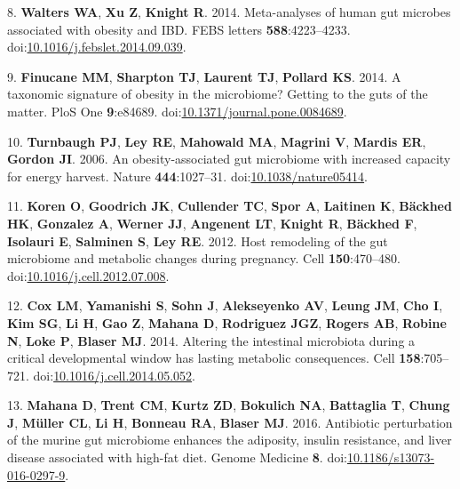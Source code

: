 \documentclass[12pt,]{article}
\begin{document}
\hypertarget{ref-waltersux5fmeta-analysesux5f2014}{}
8. \textbf{Walters WA}, \textbf{Xu Z}, \textbf{Knight R}. 2014.
Meta-analyses of human gut microbes associated with obesity and IBD.
FEBS letters \textbf{588}:4223--4233.
doi:\href{https://doi.org/10.1016/j.febslet.2014.09.039}{10.1016/j.febslet.2014.09.039}.

\hypertarget{ref-finucaneux5ftaxonomicux5f2014}{}
9. \textbf{Finucane MM}, \textbf{Sharpton TJ}, \textbf{Laurent TJ},
\textbf{Pollard KS}. 2014. A taxonomic signature of obesity in the
microbiome? Getting to the guts of the matter. PloS One
\textbf{9}:e84689.
doi:\href{https://doi.org/10.1371/journal.pone.0084689}{10.1371/journal.pone.0084689}.

\hypertarget{ref-turnbaughux5fobesity-associatedux5f2006}{}
10. \textbf{Turnbaugh PJ}, \textbf{Ley RE}, \textbf{Mahowald MA},
\textbf{Magrini V}, \textbf{Mardis ER}, \textbf{Gordon JI}. 2006. An
obesity-associated gut microbiome with increased capacity for energy
harvest. Nature \textbf{444}:1027--31.
doi:\href{https://doi.org/10.1038/nature05414}{10.1038/nature05414}.

\hypertarget{ref-Koren2012}{}
11. \textbf{Koren O}, \textbf{Goodrich JK}, \textbf{Cullender TC},
\textbf{Spor A}, \textbf{Laitinen K}, \textbf{Bäckhed HK},
\textbf{Gonzalez A}, \textbf{Werner JJ}, \textbf{Angenent LT},
\textbf{Knight R}, \textbf{Bäckhed F}, \textbf{Isolauri E},
\textbf{Salminen S}, \textbf{Ley RE}. 2012. Host remodeling of the gut
microbiome and metabolic changes during pregnancy. Cell
\textbf{150}:470--480.
doi:\href{https://doi.org/10.1016/j.cell.2012.07.008}{10.1016/j.cell.2012.07.008}.

\hypertarget{ref-Cox2014}{}
12. \textbf{Cox LM}, \textbf{Yamanishi S}, \textbf{Sohn J},
\textbf{Alekseyenko AV}, \textbf{Leung JM}, \textbf{Cho I}, \textbf{Kim
SG}, \textbf{Li H}, \textbf{Gao Z}, \textbf{Mahana D}, \textbf{Rodriguez
JGZ}, \textbf{Rogers AB}, \textbf{Robine N}, \textbf{Loke P},
\textbf{Blaser MJ}. 2014. Altering the intestinal microbiota during a
critical developmental window has lasting metabolic consequences. Cell
\textbf{158}:705--721.
doi:\href{https://doi.org/10.1016/j.cell.2014.05.052}{10.1016/j.cell.2014.05.052}.

\hypertarget{ref-Mahana2016}{}
13. \textbf{Mahana D}, \textbf{Trent CM}, \textbf{Kurtz ZD},
\textbf{Bokulich NA}, \textbf{Battaglia T}, \textbf{Chung J},
\textbf{Müller CL}, \textbf{Li H}, \textbf{Bonneau RA}, \textbf{Blaser
MJ}. 2016. Antibiotic perturbation of the murine gut microbiome enhances
the adiposity, insulin resistance, and liver disease associated with
high-fat diet. Genome Medicine \textbf{8}.
doi:\href{https://doi.org/10.1186/s13073-016-0297-9}{10.1186/s13073-016-0297-9}.
\end{document}
